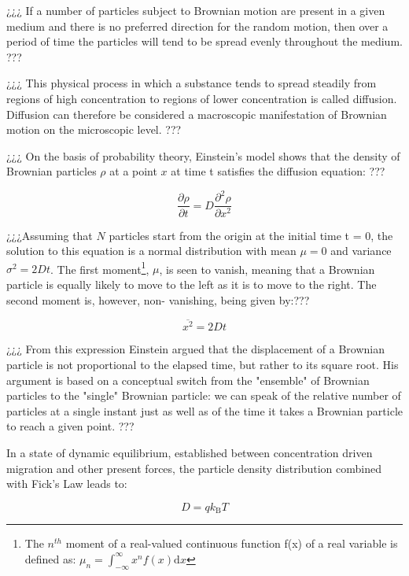 ¿¿¿ If a number of particles subject to Brownian motion are present in a given medium and there is no preferred direction for the random motion, then over a period of time the particles will tend to be spread evenly throughout the medium. ???

¿¿¿ This physical process in which a substance tends to spread steadily from regions of high concentration to regions of lower concentration is called diffusion. Diffusion can therefore be considered a macroscopic manifestation of Brownian motion on the microscopic level. ???

¿¿¿ On the basis of probability theory, Einstein's model shows that the density of Brownian particles $\rho$ at a point $x$ at time t satisfies the diffusion equation: ???

\begin{equation}
\frac{\partial \rho}{\partial t}=D \frac{\partial^{2} \rho}{\partial x^{2}}
\end{equation}

¿¿¿Assuming that $N$ particles start from the origin at the initial time t = 0, the solution to this equation is a normal distribution with mean $\mu=0$ and variance $\sigma^{2}=2 D t$. The first moment\footnote{The $n^{th}$ moment of a real-valued continuous function f(x) of a real variable is defined as:  $\mu_{n}=\int_{-\infty}^{\infty} x^{n} f(x) \mathrm{d} x$}, $\mu$, is seen to vanish, meaning that a
Brownian particle is equally likely to move to the left as it is to move to the right. The second moment is, however, non-
vanishing, being given by:???

\begin{equation}
\overline{x^{2}}=2 D t
\end{equation}

¿¿¿ From this expression Einstein argued that the displacement of a Brownian particle is not proportional to the elapsed time, but rather to its square root. His argument is based on a conceptual switch from the "ensemble" of Brownian particles to the "single" Brownian particle: we can speak of the relative number of particles at a single instant just as well as of the time it takes a Brownian particle to reach a given point. ???

In a state of dynamic equilibrium, established between concentration driven migration and other present forces, the particle density distribution combined with Fick's Law leads to:

\begin{equation}
D=q k_{\mathrm{B}} T
\end{equation}

